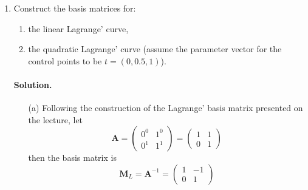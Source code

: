 \documentclass{article}
\newcommand{\bM}{\mathbf{M}}
\newcommand{\bA}{\mathbf{A}}
\newcommand{\Bezier}{B\'{e}zier}
\begin{document}
\begin{enumerate}
\paragraph{Solution.}
\begin{enumerate}
\item[(a)] By definition, the basis functions for a linear \Bezier' curve are
\begin{align*}
B^{(1)}_0(t) &= t^0(1-t)^{1-0} = (1-t), \\
B^{(1)}_1(t) &= t^1(1-t)^{1-1} = t,
\end{align*}
hence the basis matrix is
$$
\left(\begin{matrix} 1 & -1 \\ 0 & 1 \end{matrix}\right)
$$
\item[(b)] Analogously, the basis functions for a quadratic curve are
\begin{align*}
B^{(2)}_0(t) &= t^0(1-t)^{2-0}  = 1 -2t + t^2, \\
B^{(2)}_1(t) &= 2t^1(1-t)^{2-1} = 2t - 2t^2, \\
B^{(2)}_2(t) &= t^2(1-t)^{2-2} = t^2,
\end{align*}
hence the basis matrix is
$$
\left(\begin{matrix} 1 & -2 & 1\\ 0 & 2 & -2 \\ 0 & 0 & 1 \end{matrix}\right)
$$
\end{enumerate}

\item Construct the basis matrices for:
\begin{enumerate}
\item the linear Lagrange' curve,
\item the quadratic Lagrange' curve (assume the parameter vector for the control points to be $t=(0, 0.5, 1)$).
\end{enumerate}

\paragraph{Solution.}
\begin{enumerate}
\item[(a)] Following the construction of the Lagrange' basis matrix presented on the lecture, let
$$
\bA = \left(\begin{matrix} 0^0 & 1^0 \\ 0^1 & 1^1 \end{matrix}\right) = \left(\begin{matrix} 1 & 1 \\ 0 & 1 \end{matrix}\right)
$$
then the basis matrix is
$$
\bM_L = \bA^{-1} = \left(\begin{matrix} 1 & -1 \\ 0 & 1 \end{matrix}\right)
$$


\end{enumerate}
\end{enumerate}
\end{document}
